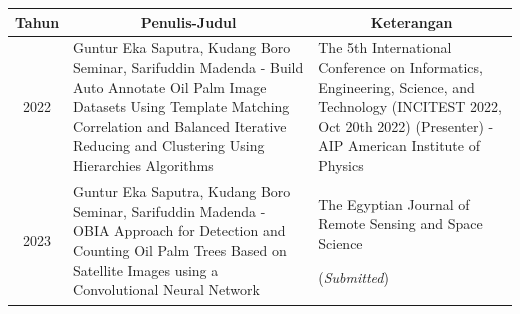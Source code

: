 \begin{table}[H]
	\begin{tabular}{|c|p{6cm}|p{5.7cm}|}
		\hline
		\textbf{Tahun} &
		\multicolumn{1}{c|}{\textbf{Penulis-Judul}} &
		\multicolumn{1}{c|}{\textbf{Keterangan}} \\ \hline
		2022 & Guntur Eka Saputra, Kudang Boro Seminar, Sarifuddin Madenda - Build Auto Annotate Oil Palm Image Datasets Using Template Matching Correlation and Balanced Iterative Reducing and Clustering Using Hierarchies Algorithms
 & The 5th International Conference on Informatics, Engineering, Science, and Technology (INCITEST 2022, Oct 20th 2022)
 (Presenter) - AIP American Institute of Physics\\ \hline
		2023 &  Guntur Eka Saputra, Kudang Boro Seminar, Sarifuddin Madenda - OBIA Approach for Detection and Counting Oil Palm Trees Based on Satellite Images using a Convolutional Neural Network  & The Egyptian Journal of Remote Sensing and Space Science
		
		(\textit{Submitted})\\ \hline

	\end{tabular}%
\end{table}


 



